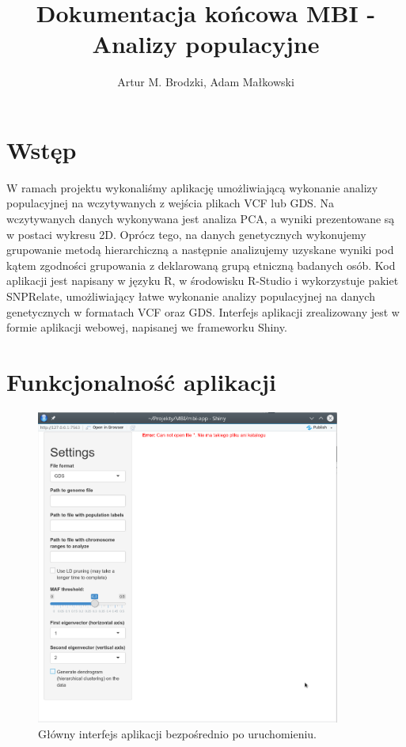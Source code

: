 \documentclass[a4paper]{article}
\title{Dokumentacja końcowa MBI - Analizy populacyjne}
\author{Artur M. Brodzki, Adam Małkowski}
\begin{document}
\maketitle

\section{Wstęp}
W ramach projektu wykonaliśmy aplikację umożliwiającą wykonanie analizy populacyjnej na wczytywanych z wejścia plikach VCF lub GDS. Na wczytywanych danych wykonywana jest analiza PCA, a wyniki prezentowane są w postaci wykresu 2D. Oprócz tego, na danych genetycznych wykonujemy grupowanie metodą hierarchiczną a następnie analizujemy uzyskane wyniki pod kątem zgodności grupowania z deklarowaną grupą etniczną badanych osób. Kod aplikacji jest napisany w języku R, w środowisku R-Studio i wykorzystuje pakiet SNPRelate, umożliwiający łatwe wykonanie analizy populacyjnej na danych genetycznych w formatach VCF oraz GDS. Interfejs aplikacji zrealizowany jest w formie aplikacji webowej, napisanej we frameworku Shiny. 

\section{Funkcjonalność aplikacji}

\begin{figure} \label{fig:empty}
\includegraphics[width=10cm]{empty-files.png}
\centering \caption{Główny interfejs aplikacji bezpośrednio po uruchomieniu.}
\end{figure}
\end{document}
